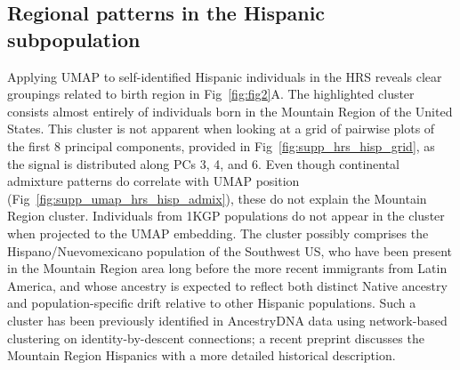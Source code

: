 \subsection{Regional patterns in the Hispanic subpopulation}
Applying UMAP to self-identified Hispanic individuals in the HRS reveals clear groupings related to birth region in Fig~\ref{fig:fig2}A. The highlighted cluster consists almost entirely of individuals born in the Mountain Region of the United States. This cluster is not apparent when looking at a grid of pairwise plots of the first 8 principal components, provided in Fig~\ref{fig:supp_hrs_hisp_grid}, as the signal is distributed along PCs 3, 4, and 6. Even though continental admixture patterns do correlate with UMAP position (Fig~\ref{fig:supp_umap_hrs_hisp_admix}), these do not explain the Mountain Region cluster. Individuals from 1KGP populations do not appear in the cluster when projected to the UMAP embedding. The cluster possibly comprises the Hispano/Nuevomexicano population of the Southwest US, who have been present in the Mountain Region area long before the more recent immigrants from Latin America, and whose ancestry is expected to reflect both distinct Native ancestry and population-specific drift relative to other Hispanic populations. Such a cluster has been previously identified in AncestryDNA data using network-based clustering on identity-by-descent connections\citep{han2017clustering}; a recent preprint discusses the Mountain Region Hispanics with a more detailed historical description\citep{Jordan333609}. 

\clearpage

